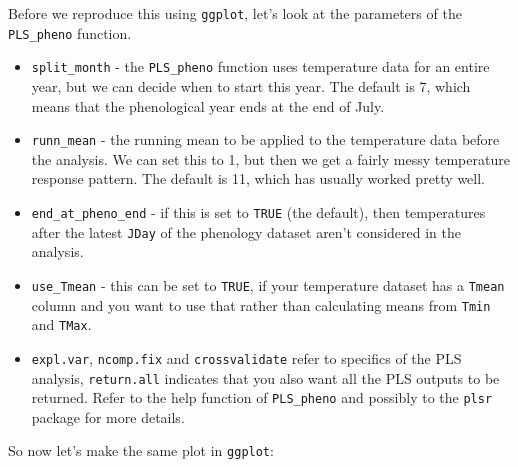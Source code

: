 \documentclass[
]{book}
\providecommand{\tightlist}{%
  \setlength{\itemsep}{0pt}\setlength{\parskip}{0pt}}
\begin{document}
Before we reproduce this using \texttt{ggplot}, let's look at the parameters of the \texttt{PLS\_pheno} function.

\begin{itemize}
\tightlist
\item
  \texttt{split\_month} - the \texttt{PLS\_pheno} function uses temperature data for an entire year, but we can decide when to start this year. The default is 7, which means that the phenological year ends at the end of July.
\item
  \texttt{runn\_mean} - the running mean to be applied to the temperature data before the analysis. We can set this to 1, but then we get a fairly messy temperature response pattern. The default is 11, which has usually worked pretty well.
\item
  \texttt{end\_at\_pheno\_end} - if this is set to \texttt{TRUE} (the default), then temperatures after the latest \texttt{JDay} of the phenology dataset aren't considered in the analysis.
\item
  \texttt{use\_Tmean} - this can be set to \texttt{TRUE}, if your temperature dataset has a \texttt{Tmean} column and you want to use that rather than calculating means from \texttt{Tmin} and \texttt{TMax}.
\item
  \texttt{expl.var}, \texttt{ncomp.fix} and \texttt{crossvalidate} refer to specifics of the PLS analysis, \texttt{return.all} indicates that you also want all the PLS outputs to be returned. Refer to the help function of \texttt{PLS\_pheno} and possibly to the \texttt{plsr} package for more details.
\end{itemize}

So now let's make the same plot in \texttt{ggplot}:
\end{document}
